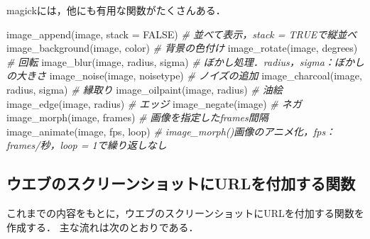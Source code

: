 \documentclass[
]{article}
\newenvironment{Shaded}{\begin{snugshade}}{\end{snugshade}}
\newcommand{\AttributeTok}[1]{\textcolor[rgb]{0.77,0.63,0.00}{#1}}
\newcommand{\CommentTok}[1]{\textcolor[rgb]{0.56,0.35,0.01}{\textit{#1}}}
\newcommand{\ConstantTok}[1]{\textcolor[rgb]{0.00,0.00,0.00}{#1}}
\newcommand{\FunctionTok}[1]{\textcolor[rgb]{0.00,0.00,0.00}{#1}}
\newcommand{\NormalTok}[1]{#1}
\begin{document}
magickには，他にも有用な関数がたくさんある．

\begin{Shaded}
\begin{Highlighting}[]
\FunctionTok{image\_append}\NormalTok{(image, }\AttributeTok{stack =} \ConstantTok{FALSE}\NormalTok{)   }\CommentTok{\# 並べて表示，stack = TRUEで縦並べ}
\FunctionTok{image\_background}\NormalTok{(image, color)       }\CommentTok{\# 背景の色付け}
\FunctionTok{image\_rotate}\NormalTok{(image, degrees)         }\CommentTok{\# 回転}
\FunctionTok{image\_blur}\NormalTok{(image, radius, sigma)     }\CommentTok{\# ぼかし処理．radius，sigma：ぼかしの大きさ}
\FunctionTok{image\_noise}\NormalTok{(image, noisetype)        }\CommentTok{\# ノイズの追加}
\FunctionTok{image\_charcoal}\NormalTok{(image, radius, sigma) }\CommentTok{\# 縁取り}
\FunctionTok{image\_oilpaint}\NormalTok{(image, radius)        }\CommentTok{\# 油絵}
\FunctionTok{image\_edge}\NormalTok{(image, radius)            }\CommentTok{\# エッジ}
\FunctionTok{image\_negate}\NormalTok{(image)                  }\CommentTok{\# ネガ}
\FunctionTok{image\_morph}\NormalTok{(image, frames)           }\CommentTok{\# 画像を指定したframes間隔}
\FunctionTok{image\_animate}\NormalTok{(image, fps, loop)      }\CommentTok{\# image\_morph()画像のアニメ化，fps：frames/秒，\textasciigrave{}loop = 1\textasciigrave{}で繰り返しなし}
\end{Highlighting}
\end{Shaded}

\hypertarget{ux30a6ux30a8ux30d6ux306eux30b9ux30afux30eaux30fcux30f3ux30b7ux30e7ux30c3ux30c8ux306burlux3092ux4ed8ux52a0ux3059ux308bux95a2ux6570}{%
\subsection{ウエブのスクリーンショットにURLを付加する関数}\label{ux30a6ux30a8ux30d6ux306eux30b9ux30afux30eaux30fcux30f3ux30b7ux30e7ux30c3ux30c8ux306burlux3092ux4ed8ux52a0ux3059ux308bux95a2ux6570}}

これまでの内容をもとに，ウエブのスクリーンショットにURLを付加する関数を作成する．
主な流れは次のとおりである．
\end{document}
